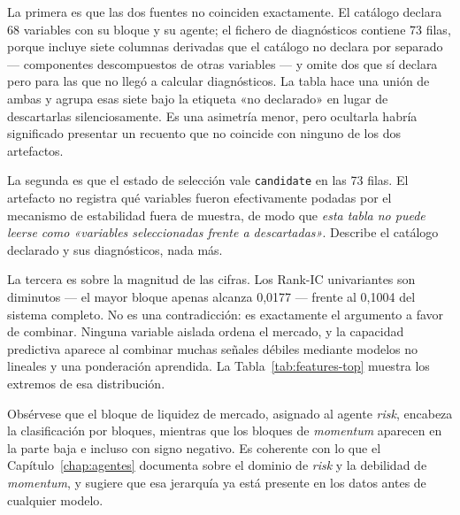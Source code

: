 La primera es que las dos fuentes no coinciden exactamente. El catálogo declara 68 variables con su
bloque y su agente; el fichero de diagnósticos contiene 73 filas, porque incluye siete columnas
derivadas que el catálogo no declara por separado --- componentes descompuestos de otras variables
--- y omite dos que sí declara pero para las que no llegó a calcular diagnósticos. La tabla hace una
unión de ambas y agrupa esas siete bajo la etiqueta «no declarado» en lugar de descartarlas
silenciosamente. Es una asimetría menor, pero ocultarla habría significado presentar un recuento que
no coincide con ninguno de los dos artefactos.

La segunda es que el estado de selección vale \texttt{candidate} en las 73 filas. El artefacto no
registra
qué variables fueron efectivamente podadas por el mecanismo de estabilidad fuera de muestra, de modo
que \emph{esta tabla no puede leerse como «variables seleccionadas frente a descartadas»}. Describe
el catálogo declarado y sus diagnósticos, nada más.

La tercera es sobre la magnitud de las cifras. Los Rank-IC univariantes son diminutos --- el mayor
bloque apenas alcanza 0,0177 --- frente al 0,1004 del sistema completo. No es una contradicción: es
exactamente el argumento a favor de combinar. Ninguna variable aislada ordena el mercado, y la
capacidad predictiva aparece al combinar muchas señales débiles mediante modelos no lineales y una
ponderación aprendida. La Tabla~\ref{tab:features-top} muestra los extremos de esa distribución.

\begin{table}[H]
  \centering
  \small
  \caption{Variables con mayor y menor Rank-IC univariante.}
  \label{tab:features-top}
  
  \caption*{Fuente: . Doce primeras y cinco últimas
  de las 73 disponibles, ordenadas por Rank-IC univariante.}
\end{table}

Obsérvese que el bloque de liquidez de mercado, asignado al agente \textit{risk}, encabeza la
clasificación por bloques, mientras que los bloques de \textit{momentum} aparecen en la parte baja e
incluso con signo negativo. Es coherente con lo que el Capítulo~\ref{chap:agentes} documenta sobre
el dominio de \textit{risk} y la debilidad de \textit{momentum}, y sugiere que esa jerarquía ya está
presente en los datos antes de cualquier modelo.
